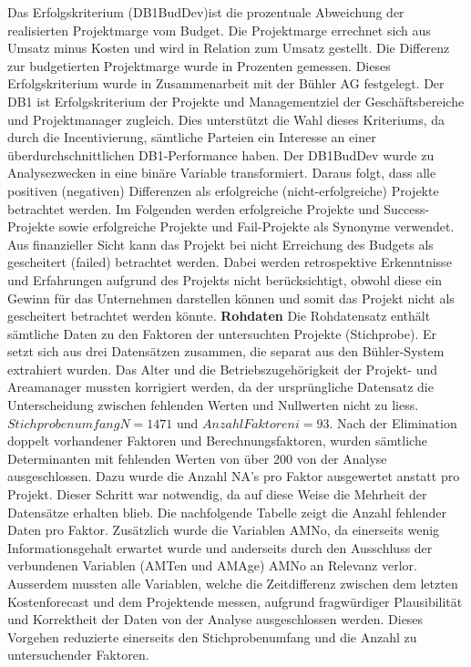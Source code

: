 \newline Das Erfolgskriterium (DB1BudDev)ist die prozentuale Abweichung der realisierten Projektmarge vom Budget. Die Projektmarge errechnet sich aus Umsatz minus Kosten und wird in Relation zum Umsatz gestellt. Die Differenz zur budgetierten Projektmarge wurde in Prozenten gemessen. Dieses Erfolgskriterium wurde in Zusammenarbeit mit der Bühler AG festgelegt. Der DB1 ist Erfolgskriterium der Projekte und Managementziel der Geschäftsbereiche und Projektmanager zugleich. Dies unterstützt die Wahl dieses Kriteriums, da durch die Incentivierung, sämtliche Parteien ein Interesse an einer überdurchschnittlichen DB1-Performance haben. Der DB1BudDev wurde zu Analysezwecken in eine binäre Variable transformiert. Daraus folgt, dass alle positiven (negativen) Differenzen als erfolgreiche (nicht-erfolgreiche) Projekte betrachtet werden. Im Folgenden werden erfolgreiche Projekte und Success-Projekte sowie erfolgreiche Projekte und Fail-Projekte als Synonyme verwendet. Aus finanzieller Sicht kann das Projekt bei nicht Erreichung des Budgets als gescheitert (failed) betrachtet werden. Dabei werden retrospektive Erkenntnisse und Erfahrungen aufgrund des Projekts nicht berücksichtigt, obwohl diese ein Gewinn für das Unternehmen darstellen können und somit das Projekt nicht als gescheitert betrachtet werden könnte.
\newline\newline\textbf{Rohdaten}
\newline Die Rohdatensatz enthält sämtliche Daten zu den Faktoren der untersuchten Projekte (Stichprobe). Er setzt sich aus drei Datensätzen zusammen, die separat aus den Bühler-System extrahiert wurden. Das Alter und die Betriebszugehörigkeit der Projekt- und Areamanager mussten korrigiert werden, da der ursprüngliche Datensatz die Unterscheidung zwischen fehlenden Werten und Nullwerten nicht zu liess.
\newline\newline $Stichprobenumfang N = 1471$ und $Anzahl Faktoren i = 93$.
\newline\newline
Nach der Elimination doppelt vorhandener Faktoren und Berechnungsfaktoren, wurden sämtliche Determinanten mit fehlenden Werten von über 200 von der Analyse ausgeschlossen. Dazu wurde die Anzahl NA's pro Faktor ausgewertet anstatt pro Projekt. Dieser Schritt war notwendig, da auf diese Weise die Mehrheit der Datensätze erhalten blieb. Die nachfolgende Tabelle zeigt die Anzahl fehlender Daten pro Faktor. Zusätzlich wurde die Variablen AMNo, da einerseits wenig Informationsgehalt erwartet wurde und anderseits durch den Ausschluss der verbundenen Variablen (AMTen und AMAge)  AMNo an Relevanz verlor. Ausserdem mussten alle Variablen, welche die Zeitdifferenz zwischen dem letzten Kostenforecast und dem Projektende messen, aufgrund fragwürdiger Plausibilität und Korrektheit der Daten von der Analyse ausgeschlossen werden. Dieses Vorgehen reduzierte einerseits den Stichprobenumfang und die Anzahl zu untersuchender Faktoren. 
